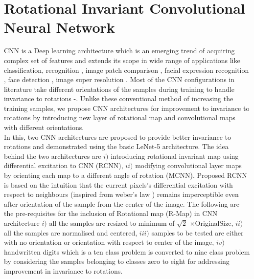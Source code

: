 \chapter{Rotational Invariant Convolutional Neural Network}
\label{Chapt6}
 
  CNN is a Deep learning architecture which is an emerging trend of acquiring complex set of features and extends its scope in wide range of applications like classification, recognition \cite{P8}, image patch comparison \cite{P11}, facial expression recognition \cite{P10}, face detection \cite{P9}, image super resolution \cite{RCNN24}. Most of the CNN configurations in literature take different orientations of the samples during training to handle invariance to rotations \cite{RCNN21}-\cite{RCNN23}. Unlike these conventional method of increasing the training samples, we propose CNN architectures for improvement to invariance to rotations by introducing new layer of rotational map and convolutional maps with different orientations.\\	
	
\tab In this, two CNN architectures are proposed to provide better invariance to rotations and demonstrated using the basic LeNet-5 architecture. The idea behind the two architectures are $i)$ introducing rotational invariant map using differential excitation to CNN (RCNN), $ii)$ modifying convolutional layer maps by orienting each map to a different angle of rotation (MCNN). Proposed RCNN is based on the intuition that the current pixels's differential excitation with respect to neighbours (inspired from weber's law \cite{RCNN30}) remains imperceptible even after orientation of the sample from the center of the image. The following are the pre-requisites for the inclusion of Rotational map (R-Map) in CNN architecture $i)$ all the samples are resized to minimum of $\sqrt{2}$ $\times$OriginalSize, $ii)$ all the samples are normalised and centered, $iii)$ samples to be tested are either with no orientation or orientation with respect to center of the image, $iv)$ handwritten digits which is a ten class problem is converted to nine class problem by considering the samples belonging to classes zero to eight for addressing improvement in invariance to rotations.\\

